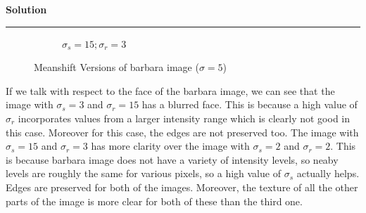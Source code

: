 \documentclass[a4paper]{article}
\newenvironment{solution}[2][]{%
    \begin{mdframed}[linecolor=green!60!black, linewidth=2pt, roundcorner=10pt, backgroundcolor=green!5!white, skipabove=12pt, skipbelow=12pt]%
        \textbf{\large #2} %
        \par\noindent\rule{\textwidth}{0.4pt} %
        \vspace{0.5em} %
}{%
    \end{mdframed}%
}
\begin{document}
\begin{solution}{Solution}
\begin{figure}[H]
\begin{subfigure}[b]{0.24\textwidth}
        \caption{$\sigma_s=15;\sigma_r=3$}
        \label{fig:subfig3}
    \end{subfigure}
    
    \caption{Meanshift Versions of barbara image ($\sigma=5$)}
    \label{fig:overall}
\end{figure}

If we talk with respect to the face of the barbara image, we can see that the image with $\sigma_s=3$ and $\sigma_r=15$ has a blurred face. This is because a high value of $\sigma_r$ incorporates values from a larger intensity range which is clearly not good in this case. Moreover for this case, the edges are not preserved too. The image with $\sigma_s=15$ and $\sigma_r=3$ has more clarity over the image with $\sigma_s=2$ and $\sigma_r=2$. This is because barbara image does not have a variety of intensity levels, so neaby levels are roughly the same for various pixels, so a high value of $\sigma_s$ actually helps. Edges are preserved for both of the images. Moreover, the texture of all the other parts of the image is more clear for both of these than the third one.






\end{solution}
\end{document}
